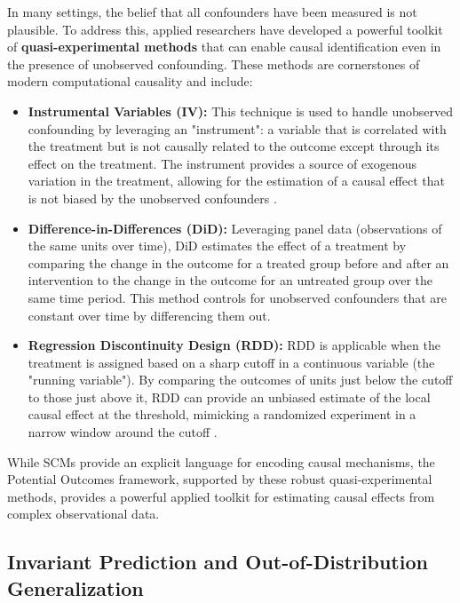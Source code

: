 {In many settings, the belief that all confounders have been measured is not plausible. To address this, applied researchers have developed a powerful toolkit of \textbf{quasi-experimental methods} that can enable causal identification even in the presence of unobserved confounding. These methods are cornerstones of modern computational causality and include:
\begin{itemize}
    \item \textbf{Instrumental Variables (IV):} This technique is used to handle unobserved confounding by leveraging an "instrument": a variable that is correlated with the treatment but is not causally related to the outcome except through its effect on the treatment. The instrument provides a source of exogenous variation in the treatment, allowing for the estimation of a causal effect that is not biased by the unobserved confounders \cite{angrist1996identification}.
    \item \textbf{Difference-in-Differences (DiD):} Leveraging panel data (observations of the same units over time), DiD estimates the effect of a treatment by comparing the change in the outcome for a treated group before and after an intervention to the change in the outcome for an untreated group over the same time period. This method controls for unobserved confounders that are constant over time by differencing them out\cite{card1994minimum}\cite{callaway2021difference}.
    \item \textbf{Regression Discontinuity Design (RDD):} RDD is applicable when the treatment is assigned based on a sharp cutoff in a continuous variable (the "running variable"). By comparing the outcomes of units just below the cutoff to those just above it, RDD can provide an unbiased estimate of the local causal effect at the threshold, mimicking a randomized experiment in a narrow window around the cutoff \cite{imbens2008regression}.
\end{itemize}

While SCMs provide an explicit language for encoding causal mechanisms, the Potential Outcomes framework, supported by these robust quasi-experimental methods, provides a powerful applied toolkit for estimating causal effects from complex observational data. 

\subsection{Invariant Prediction and Out-of-Distribution Generalization}

}
